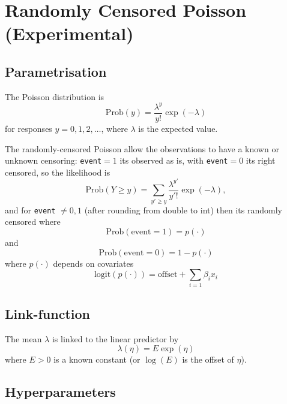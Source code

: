 \documentclass[a4paper,11pt]{article}
\begin{document}
\section*{Randomly Censored Poisson (Experimental)}

\subsection*{Parametrisation}

The Poisson distribution is
\begin{displaymath}
    \text{Prob}(y) = \frac{\lambda^{y}}{y!}\exp(-\lambda)
\end{displaymath}
for responses $y=0, 1, 2, \ldots$, where $\lambda$ is the expected
value.

The randomly-censored Poisson allow the observations to have a known
or unknown censoring: \texttt{event}$=1$ its observed as is, with
\texttt{event}$=0$ its right censored, so the likelihood is
\begin{displaymath}
    \text{Prob}(Y \ge y) = \sum_{y' \ge y} \frac{\lambda^{y'}}{y'!}\exp(-\lambda),
\end{displaymath}
and for \texttt{event} $\not=0,1$ (after rounding from double to int)
then its randomly censored where
\begin{displaymath}
    \text{Prob}(\text{event} = 1) = p(\cdot)
\end{displaymath}
and 
\begin{displaymath}
    \text{Prob}(\text{event} = 0) = 1-p(\cdot)
\end{displaymath}
where $p(\cdot)$ depends on covariates
\begin{displaymath}
    \text{logit}(p(\cdot)) = \text{offset} + \sum_{i=1} \beta_i x_i
\end{displaymath}


\subsection*{Link-function}

The mean $\lambda$ is linked to the linear predictor by
\begin{displaymath}
    \lambda(\eta) = E \exp(\eta)
\end{displaymath}
where $E>0$ is a known constant (or $\log(E)$ is the offset of $\eta$).

\subsection*{Hyperparameters}
\end{document}
